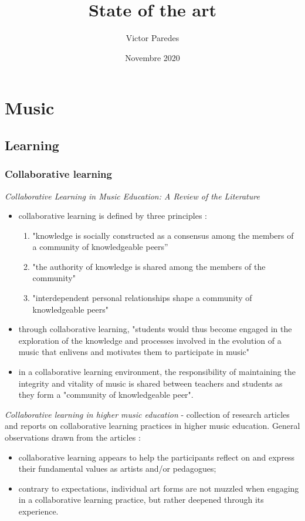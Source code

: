 \documentclass[11pt]{article}
\title{State of the art}
\author{Victor Paredes}
\date{Novembre 2020}
\begin{document}
\maketitle

\tableofcontents

\section{Music}

\subsection{Learning}
\subsubsection{Collaborative learning}
\textit{Collaborative Learning in Music Education: A Review of the Literature} \citep{luce_collaborative_2001}
\begin{itemize}
    \item collaborative learning is defined by three principles :
    \begin{enumerate}
        \item "knowledge is socially constructed as a consensus among the members of a community of knowledgeable peers”
        \item "the authority of knowledge is shared among the members of the community"
        \item "interdependent personal relationships shape a community of knowledgeable peers"
    \end{enumerate}
    \item through collaborative learning, "students would thus become engaged in the exploration of the knowledge and processes involved in the evolution of a music that enlivens and motivates them to participate in music"
    \item in a collaborative learning environment, the responsibility of maintaining the integrity and vitality of music is shared between teachers and students as they form a "community of knowledgeable peer".
\end{itemize}

\textit{Collaborative learning in higher music education} \citep{gaunt_collaborative_2016} -
collection of research articles and reports on collaborative learning practices in higher music education. General observations drawn from the articles :
\begin{itemize}
    \item collaborative learning appears to help the participants reflect on and express their fundamental values as artists and/or pedagogues;
    \item contrary to expectations, individual art forms are not muzzled when engaging in a collaborative learning practice, but rather deepened through its experience.
\end{itemize}
\end{document}
